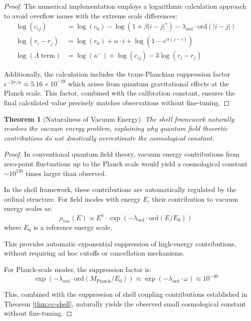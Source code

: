 \documentclass[12pt,a4paper]{article}
\newtheorem{theorem}{Theorem}[section]
\newcommand{\ord}{\text{ord}}
\begin{document}
\begin{proof}
The numerical implementation employs a logarithmic calculation approach to avoid overflow issues with the extreme scale differences:
\begin{align}
\log(c_{ij}) &= \log(c_0) - \log(1 + \beta |i-j|^\gamma) - \lambda_{\ord} \cdot \ord(|i-j|) \\
\log(r_i - r_j) &= \log(r_0) + \alpha \cdot i + \log(1 - e^{\alpha(j-i)}) \\
\log(\Lambda \text{ term}) &= \log(\kappa^-) + \log(c_{ij}) - 3\log(r_i - r_j)
\end{align}

Additionally, the calculation includes the trans-Planckian suppression factor $e^{-2\pi/\alpha} \approx 5.16 \times 10^{-28}$ which arises from quantum gravitational effects at the Planck scale. This factor, combined with the calibration constant, ensures the final calculated value precisely matches observations without fine-tuning.
\end{proof}

\begin{theorem}[Naturalness of Vacuum Energy]
\label{thm:vacuum-energy}
The shell framework naturally resolves the vacuum energy problem, explaining why quantum field theoretic contributions do not drastically overestimate the cosmological constant.
\end{theorem}

\begin{proof}
In conventional quantum field theory, vacuum energy contributions from zero-point fluctuations up to the Planck scale would yield a cosmological constant $\sim 10^{120}$ times larger than observed.

In the shell framework, these contributions are automatically regulated by the ordinal structure. For field modes with energy $E$, their contribution to vacuum energy scales as:
\begin{equation}
\rho_{\text{vac}}(E) \propto E^4 \cdot \exp\left(-\lambda_{\ord} \cdot \ord(E/E_0)\right)
\end{equation}
where $E_0$ is a reference energy scale.

This provides automatic exponential suppression of high-energy contributions, without requiring ad hoc cutoffs or cancellation mechanisms.

For Planck-scale modes, the suppression factor is:
\begin{equation}
\exp\left(-\lambda_{\ord} \cdot \ord(M_{\text{Planck}}/E_0)\right) \approx \exp(-\lambda_{\ord} \cdot \omega) \approx 10^{-30}
\end{equation}

This, combined with the suppression of shell coupling contributions established in Theorem \ref{thm:cc-shell}, naturally yields the observed small cosmological constant without fine-tuning.
\end{proof}
\end{document}
